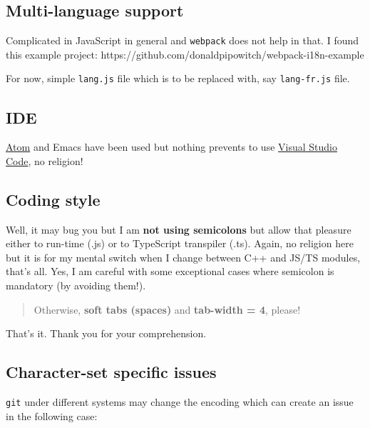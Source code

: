 \documentclass[11pt]{article}
\begin{document}
    \hypertarget{multi-language-support}{%
\subsection{Multi-language support}\label{multi-language-support}}

    Complicated in JavaScript in general and \texttt{webpack} does not help
in that. I found this example project:
https://github.com/donaldpipowitch/webpack-i18n-example

    For now, simple \texttt{lang.js} file which is to be replaced with, say
\texttt{lang-fr.js} file.

    \hypertarget{ide}{%
\subsection{IDE}\label{ide}}

    \href{https://atom.io}{Atom} and Emacs have been used but nothing
prevents to use \href{https://code.visualstudio.com}{Visual Studio
Code}, no religion!

    \hypertarget{coding-style}{%
\subsection{Coding style}\label{coding-style}}

    Well, it may bug you but I am \textbf{not using semicolons} but allow
that pleasure either to run-time (.js) or to TypeScript transpiler
(.ts). Again, no religion here but it is for my mental switch when I
change between C++ and JS/TS modules, that's all. Yes, I am careful with
some exceptional cases where semicolon is mandatory (by avoiding them!).

\begin{quote}
Otherwise, \textbf{soft tabs (spaces)} and \textbf{tab-width = 4},
please!
\end{quote}

That's it. Thank you for your comprehension.

    \hypertarget{character-set-specific-issues}{%
\subsection{Character-set specific
issues}\label{character-set-specific-issues}}

    \texttt{git} under different systems may change the encoding which can
create an issue in the following case:
\end{document}
